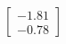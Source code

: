 \documentclass[preview]{standalone}
\begin{document}
\begin{align*}
\begin{bmatrix} -1.81 \\ -0.78 \end{bmatrix}
\end{align*}
\end{document}

